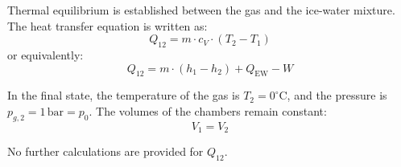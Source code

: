 Thermal equilibrium is established between the gas and the ice-water mixture. The heat transfer equation is written as:  
\[
Q_{12} = m \cdot c_V \cdot (T_2 - T_1)
\]  
or equivalently:  
\[
Q_{12} = m \cdot (h_1 - h_2) + Q_{\text{EW}} - W
\]  

In the final state, the temperature of the gas is \( T_2 = 0^\circ\text{C} \), and the pressure is \( p_{g,2} = 1 \, \text{bar} = p_0 \). The volumes of the chambers remain constant:  
\[
V_1 = V_2
\]  

No further calculations are provided for \( Q_{12} \).